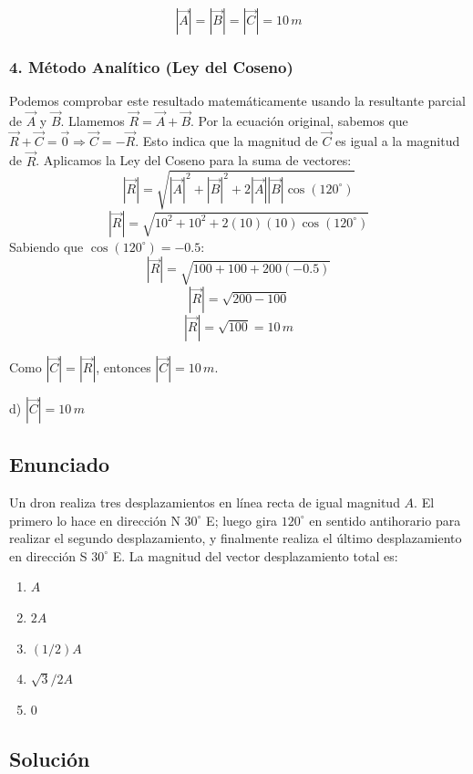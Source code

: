 \documentclass[12pt, a4paper]{article}
\begin{document}
$$|\vec{A}| = |\vec{B}| = |\vec{C}| = 10 \, \si{m}$$

\subsubsection*{4. Método Analítico (Ley del Coseno)}
Podemos comprobar este resultado matemáticamente usando la resultante parcial de $\vec{A}$ y $\vec{B}$.
Llamemos $\vec{R} = \vec{A} + \vec{B}$. Por la ecuación original, sabemos que $\vec{R} + \vec{C} = \vec{0} \Rightarrow \vec{C} = -\vec{R}$.
Esto indica que la magnitud de $\vec{C}$ es igual a la magnitud de $\vec{R}$.
Aplicamos la Ley del Coseno para la suma de vectores:
$$|\vec{R}| = \sqrt{|\vec{A}|^2 + |\vec{B}|^2 + 2|\vec{A}||\vec{B}|\cos(120^\circ)}$$
$$|\vec{R}| = \sqrt{10^2 + 10^2 + 2(10)(10)\cos(120^\circ)}$$
Sabiendo que $\cos(120^\circ) = -0.5$:
$$|\vec{R}| = \sqrt{100 + 100 + 200(-0.5)}$$
$$|\vec{R}| = \sqrt{200 - 100}$$
$$|\vec{R}| = \sqrt{100} = 10 \, \si{m}$$

Como $|\vec{C}| = |\vec{R}|$, entonces $|\vec{C}| = 10 \, \si{m}$.

\begin{tcolorbox}[colback=green!5!white, colframe=green!50!black, title=Respuesta Final]
\centering \Large d) $|\vec{C}| = 10 \, \si{m}$
\end{tcolorbox}

\newpage

\subsection*{Enunciado}
Un dron realiza tres desplazamientos en línea recta de igual magnitud $A$. El primero lo hace en dirección N $30^\circ$ E; luego gira $120^\circ$ en sentido antihorario para realizar el segundo desplazamiento, y finalmente realiza el último desplazamiento en dirección S $30^\circ$ E. La magnitud del vector desplazamiento total es:

\begin{enumerate}[label=\alph*)]
    \item $A$
    \item $2A$
    \item $(1/2) A$
    \item $\sqrt{3}/2 A$
    \item $0$
\end{enumerate}

\subsection*{Solución}
\end{document}
